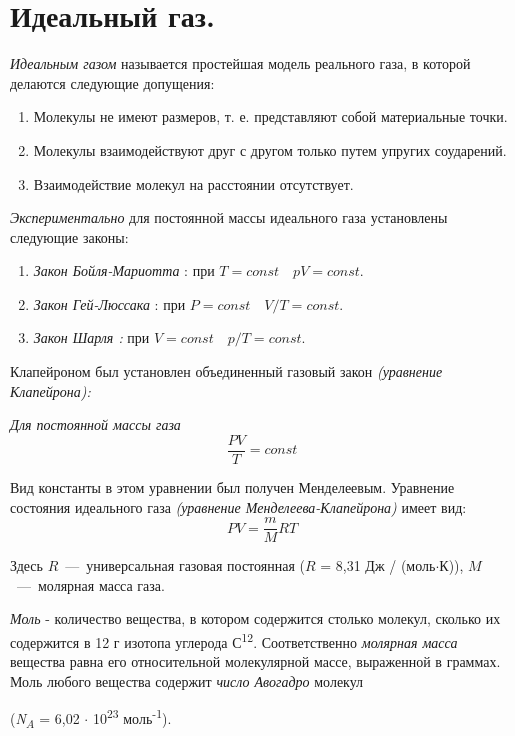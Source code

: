 \chapter{Идеальный газ.}

\emph{Идеальным газом} называется простейшая модель реального газа, в
которой делаются следующие допущения:

\begin{enumerate}
\def\labelenumi{\arabic{enumi}.}
\item
  Молекулы не имеют размеров, т. е. представляют собой материальные
  точки.
  \item
  Молекулы взаимодействуют друг с другом только путем упругих
  соударений.
\item
  Взаимодействие молекул на расстоянии отсутствует.
\end{enumerate}

\emph{Экспериментально} для постоянной массы идеального газа установлены
следующие законы:

\begin{enumerate}
\def\labelenumi{\arabic{enumi}.}
\item \emph{Закон Бойля-Мариотта} : при $T = const\quad pV = const.$
\item \emph{Закон Гей-Люссака} : при $P = const\quad V/T = const.$
\item \emph{Закон Шарля :} при $V = const\quad p/T = const.$
\end{enumerate}

Клапейроном был установлен объединенный газовый закон \emph{(уравнение
Клапейрона):}

\emph{Для постоянной массы газа} \[\frac{PV}{T} = const\]

Вид константы в этом уравнении был получен Менделеевым. Уравнение
состояния идеального газа \emph{(уравнение Менделеева-Клапейрона)} имеет
вид: 
\begin{equation}
  PV = \frac{m}{M}RT
\end{equation}

Здесь $R$~---~универсальная газовая постоянная ($R$ = 8,31 Дж /
(моль$\cdot$К)), $M$~---~молярная масса газа.

\emph{Моль} - количество вещества, в котором содержится столько молекул,
сколько их содержится в 12 г изотопа углерода С\textsuperscript{12}.%
Соответственно \emph{молярная масса} вещества равна его относительной
молекулярной массе, выраженной в граммах. Моль любого вещества содержит
\emph{число Авогадро} молекул
\begin{center}
  (\emph{N\textsubscript{A}} = 6,02 $\cdot$ 10\textsuperscript{23} моль\textsuperscript{-1}).
\end{center}

